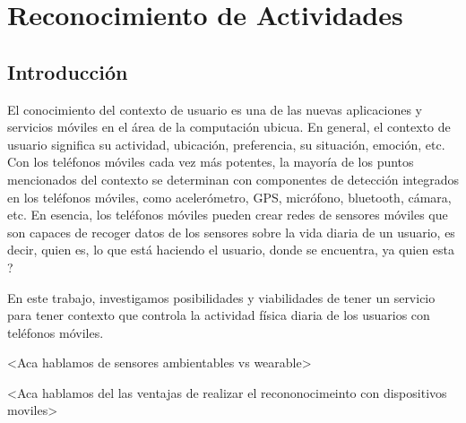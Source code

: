 
\chapter{Reconocimiento de Actividades}

%

\section{Introducción}
El conocimiento del contexto de usuario es una de las nuevas aplicaciones y servicios móviles en el área de la computación ubicua.
En general, el contexto de usuario significa su actividad, ubicación, preferencia, su situación, emoción, etc. Con los teléfonos móviles cada vez más potentes, la mayoría de los puntos mencionados del contexto se determinan con componentes de detección integrados en los teléfonos móviles, como acelerómetro, GPS, micrófono, bluetooth, cámara, etc. En esencia, los teléfonos móviles pueden crear redes de sensores móviles que son capaces de recoger datos de los sensores sobre la vida diaria de un usuario, es decir, quien es, lo que está haciendo el usuario, donde se encuentra, ya quien esta ? 

En este trabajo, investigamos posibilidades y viabilidades de tener un servicio para tener contexto que controla la actividad física diaria de los usuarios con teléfonos móviles.


<Aca hablamos de sensores ambientables vs wearable>

<Aca hablamos del las ventajas de realizar el recononocimeinto con dispositivos moviles>

